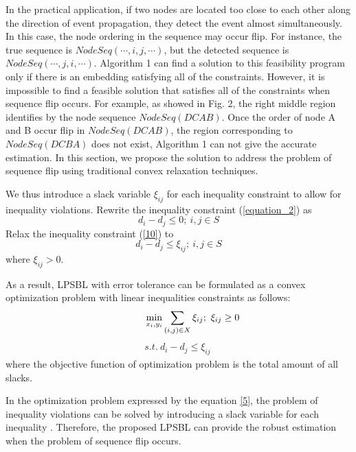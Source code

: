 In the practical application, if two nodes are located too close to each other along the direction of event propagation, they detect the event almost simultaneously. 
In this case, the node ordering in the sequence may occur flip. 
For instance, the true sequence is $NodeSeq ( \cdots ,i,j, \cdots )$, but the detected sequence is $NodeSeq ( \cdots ,j,i, \cdots )$.
Algorithm 1 can find a solution to this feasibility program only if there is an embedding satisfying all of the constraints. 
However, it is impossible to find a feasible solution that satisfies all of the constraints when sequence flip occurs. 
For example, as showed in Fig. 2, the right middle region identifies by the node sequence $NodeSeq (D C A B)$. 
Once the order of node A and B occur flip in $NodeSeq (D C A B)$, the region corresponding to $NodeSeq (D C B A)$ does not exist, Algorithm 1 can not give the accurate estimation.
In this section, we propose the solution to address the problem of sequence flip using traditional convex relaxation techniques.


We thus introduce a slack variable ${\xi _{ij}}$ for each inequality constraint to allow for inequality violations.
Rewrite the inequality constraint (\ref{equation_2}) as
 \begin{equation} \label{10}
 d_i - d_j  \le  0 ; \  i,j \in S
 \end{equation}
 Relax the inequality constraint (\ref{10}) to
 \begin{equation} \label{11}
 d_i - d_j  \le  \xi _{ij} ; \  i,j \in S
 \end{equation}
 where
 \begin{math}
 \xi _{ij}  > 0
 \end{math}.
 
As a result, LPSBL with error tolerance can be formulated as a convex optimization problem with linear inequalities constraints as follows:
 \begin{equation} \label{5}
\quad \quad \quad \mathop {\min }\limits_{{x_i},{y_i}} \sum\limits_{(i,j) \in X} {{\xi _{ij}}};\  \xi _{ij} \ge 0\\
  \end{equation}
  \begin{align*}
 s.t.\   d_i - d_j  \le  \xi _{ij} \
\end{align*}
where the objective function of optimization problem is the total amount of all slacks. 

In the optimization problem expressed by the equation \eqref{5}, the problem of inequality violations can be solved by introducing a slack variable for each inequality \cite{Boyd2004}.
Therefore, the proposed LPSBL can provide the robust estimation when the problem of sequence flip occurs.

